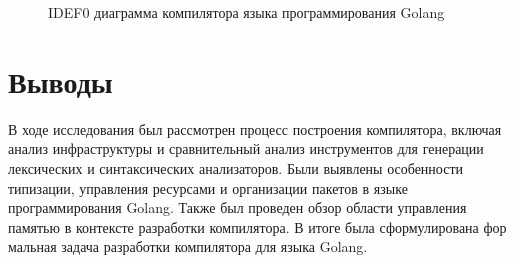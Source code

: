 \begin{figure}[h]
    \centering

    

    \caption{IDEF0 диаграмма компилятора языка программирования Golang}
    \label{fig:idef-a0}
\end{figure}


\section*{Выводы}

В ходе исследования был рассмотрен процесс построения компилятора, включая анализ инфраструктуры и сравнительный анализ инструментов для генерации лексических и синтаксических анализаторов.
Были выявлены особенности типизации, управления ресурсами и организации пакетов в языке программирования Golang.
Также был проведен обзор области управления памятью в контексте разработки компилятора.
В итоге была сформулирована фор мальная задача разработки компилятора для языка Golang.